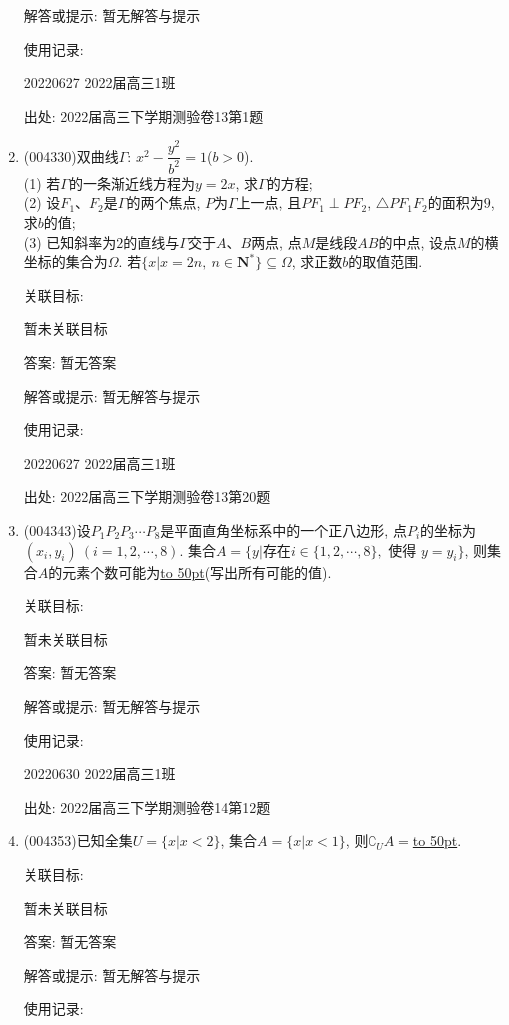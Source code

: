 \documentclass[10pt,a4paper]{article}
\newcommand{\blank}[1]{\underline{\hbox to #1pt{}}}
\begin{document}
\begin{enumerate}[1.]
解答或提示: 暂无解答与提示

使用记录:

20220627	2022届高三1班	


出处: 2022届高三下学期测验卷13第1题
\item { (004330)}双曲线$\Gamma$: $x^2-\dfrac{y^2}{b^2}=1$($b>0$).\\
(1) 若$\Gamma$的一条渐近线方程为$y=2x$, 求$\Gamma$的方程;\\
(2) 设$F_1$、$F_2$是$\Gamma$的两个焦点, $P$为$\Gamma$上一点, 且$PF_1\perp PF_2$, $\triangle PF_1F_2$的面积为$9$, 求$b$的值;\\
(3) 已知斜率为$2$的直线与$\Gamma$交于$A$、$B$两点, 点$M$是线段$AB$的中点, 设点$M$的横坐标的集合为$\Omega$. 若$\{x|x=2n,\ n\in \mathbf{N}^* \}\subseteq \Omega$, 求正数$b$的取值范围.


关联目标:

暂未关联目标

答案: 暂无答案

解答或提示: 暂无解答与提示

使用记录:

20220627	2022届高三1班			


出处: 2022届高三下学期测验卷13第20题
\item { (004343)}设$P_1P_2P_3\cdots P_8$是平面直角坐标系中的一个正八边形, 点$P_i$的坐标为$(x_i,y_i) \ (i=1,2,\cdots,8)$. 集合$A=\{y|\text{存在} i\in \{1,2,\cdots,8\},\text{ 使得 }y=y_i\}$, 则集合$A$的元素个数可能为\blank{50}(写出所有可能的值).


关联目标:

暂未关联目标

答案: 暂无答案

解答或提示: 暂无解答与提示

使用记录:

20220630	2022届高三1班	


出处: 2022届高三下学期测验卷14第12题
\item { (004353)}已知全集$U=\{x|x<2\}$, 集合$A=\{x|x<1\}$, 则$\complement_UA=$\blank{50}.


关联目标:

暂未关联目标

答案: 暂无答案

解答或提示: 暂无解答与提示

使用记录:


\end{enumerate}
\end{document}
